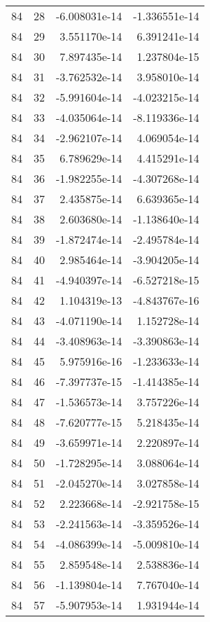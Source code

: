 \begin{tabular}{rrrr}
  84 &   28 & -6.008031e-14 & -1.336551e-14 \\
  84 &   29 &  3.551170e-14 &  6.391241e-14 \\
  84 &   30 &  7.897435e-14 &  1.237804e-15 \\
  84 &   31 & -3.762532e-14 &  3.958010e-14 \\
  84 &   32 & -5.991604e-14 & -4.023215e-14 \\
  84 &   33 & -4.035064e-14 & -8.119336e-14 \\
  84 &   34 & -2.962107e-14 &  4.069054e-14 \\
  84 &   35 &  6.789629e-14 &  4.415291e-14 \\
  84 &   36 & -1.982255e-14 & -4.307268e-14 \\
  84 &   37 &  2.435875e-14 &  6.639365e-14 \\
  84 &   38 &  2.603680e-14 & -1.138640e-14 \\
  84 &   39 & -1.872474e-14 & -2.495784e-14 \\
  84 &   40 &  2.985464e-14 & -3.904205e-14 \\
  84 &   41 & -4.940397e-14 & -6.527218e-15 \\
  84 &   42 &  1.104319e-13 & -4.843767e-16 \\
  84 &   43 & -4.071190e-14 &  1.152728e-14 \\
  84 &   44 & -3.408963e-14 & -3.390863e-14 \\
  84 &   45 &  5.975916e-16 & -1.233633e-14 \\
  84 &   46 & -7.397737e-15 & -1.414385e-14 \\
  84 &   47 & -1.536573e-14 &  3.757226e-14 \\
  84 &   48 & -7.620777e-15 &  5.218435e-14 \\
  84 &   49 & -3.659971e-14 &  2.220897e-14 \\
  84 &   50 & -1.728295e-14 &  3.088064e-14 \\
  84 &   51 & -2.045270e-14 &  3.027858e-14 \\
  84 &   52 &  2.223668e-14 & -2.921758e-15 \\
  84 &   53 & -2.241563e-14 & -3.359526e-14 \\
  84 &   54 & -4.086399e-14 & -5.009810e-14 \\
  84 &   55 &  2.859548e-14 &  2.538836e-14 \\
  84 &   56 & -1.139804e-14 &  7.767040e-14 \\
  84 &   57 & -5.907953e-14 &  1.931944e-14 \\

\end{tabular}
